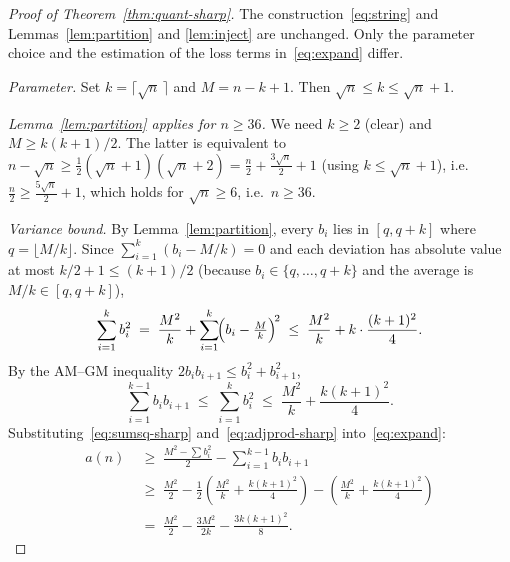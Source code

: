 ﻿\documentclass[11pt,a4paper]{article}
\theoremstyle{plain}
\theoremstyle{definition}
\theoremstyle{remark}
\begin{document}
\begin{proof}[Proof of Theorem~\ref{thm:quant-sharp}]
The construction~\eqref{eq:string} and Lemmas~\ref{lem:partition} and
\ref{lem:inject} are unchanged.  Only the parameter choice and the
estimation of the loss terms in~\eqref{eq:expand} differ.

\smallskip\noindent\textit{Parameter.}  Set
$k=\lceil\sqrt n\,\rceil$ and $M=n-k+1$.  Then
$\sqrt n\le k\le\sqrt n+1$.

\smallskip\noindent\textit{Lemma~\ref{lem:partition} applies for
$n\ge 36$.}  We need $k\ge 2$ (clear) and $M\ge k(k+1)/2$.  The
latter is equivalent to $n-\sqrt n\ge\tfrac12(\sqrt n+1)(\sqrt n+2)
=\tfrac{n}{2}+\tfrac{3\sqrt n}{2}+1$ (using $k\le\sqrt n+1$), i.e.\
$\tfrac{n}{2}\ge\tfrac{5\sqrt n}{2}+1$, which holds for
$\sqrt n\ge 6$, i.e.\ $n\ge 36$.

\smallskip\noindent\textit{Variance bound.}
By Lemma~\ref{lem:partition}, every $b_i$ lies in $[q,q+k]$ where
$q=\lfloor M/k\rfloor$.  Since $\sum_{i=1}^k(b_i-M/k)=0$ and each
deviation has absolute value at most $k/2+1\le(k+1)/2$
(because $b_i\in\{q,\ldots,q+k\}$ and the average is $M/k\in[q,q+k]$),
\begin{equation}\label{eq:sumsq-sharp}
  \sum_{i=1}^k b_i^2
  \;=\;\frac{M^2}{k}+\sum_{i=1}^k\!\Bigl(b_i-\tfrac{M}{k}\Bigr)^{\!2}
  \;\le\;\frac{M^2}{k}+k\cdot\frac{(k+1)^2}{4}.
\end{equation}
By the AM--GM inequality
$2b_ib_{i+1}\le b_i^2+b_{i+1}^2$,
\begin{equation}\label{eq:adjprod-sharp}
  \sum_{i=1}^{k-1}b_ib_{i+1}
  \;\le\;\sum_{i=1}^k b_i^2
  \;\le\;\frac{M^2}{k}+\frac{k(k+1)^2}{4}.
\end{equation}
Substituting~\eqref{eq:sumsq-sharp} and~\eqref{eq:adjprod-sharp}
into~\eqref{eq:expand}:
\begin{align*}
  a(n)
  &\;\ge\;\frac{M^2-\sum b_i^2}{2}-\sum_{i=1}^{k-1}b_ib_{i+1} \\
  &\;\ge\;\frac{M^2}{2}-\frac{1}{2}\!\left(\frac{M^2}{k}+\frac{k(k+1)^2}{4}\right)
        -\!\left(\frac{M^2}{k}+\frac{k(k+1)^2}{4}\right) \\
  &\;=\;\frac{M^2}{2}-\frac{3M^2}{2k}-\frac{3k(k+1)^2}{8}.
\end{align*}


\end{proof}
\end{document}
